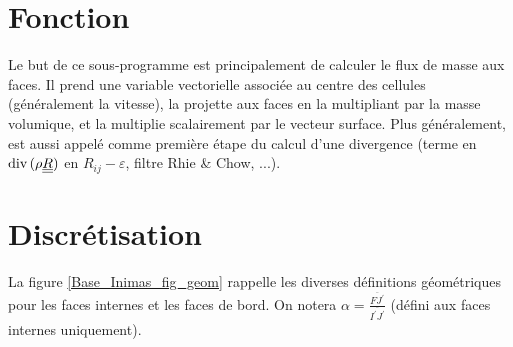 
%
%
%
%



\vspace{1cm}
\section*{Fonction}
Le but de ce sous-programme est principalement de calculer le flux de masse aux
faces. Il prend une variable vectorielle associée au centre des cellules
(généralement la vitesse), la projette aux faces en la multipliant par la
masse volumique, et la multiplie scalairement par le vecteur surface.
Plus généralement,  est aussi appelé comme première étape
du calcul d'une divergence (terme en $\text{div}\,(\rho\underline{\underline{R}})$ en
$R_{ij}-\varepsilon$, filtre Rhie \& Chow, ...).

\section*{Discrétisation}

La figure \ref{Base_Inimas_fig_geom} rappelle les diverses définitions géométriques
pour les faces internes et les faces de bord. On notera
$\displaystyle \alpha=\frac{\overline{FJ^\prime}}{\overline{I^\prime J^\prime}}$ (défini aux faces
internes uniquement).

